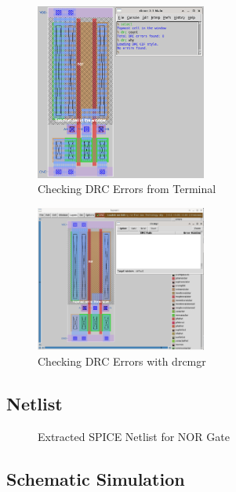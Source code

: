 \documentclass{article}
\begin{document}
	\begin{figure}[H]
		\centerline{\includegraphics[width=0.5\textwidth]{nor_drc_errors_terminal.png}}
		\caption{Checking DRC Errors from Terminal}
		\label{fig::nor_drc_errors_terminal}
	\end{figure}
	
	\begin{figure}[H]
		\centerline{\includegraphics[width=0.5\textwidth]{nor_drc_errors_drcmgr.png}}
		\caption{Checking DRC Errors with drcmgr}
		\label{fig::nor_drc_errors_drcmgr}
	\end{figure}
	
	\subsection{Netlist}
	
	\begin{figure}[H]
		
		\caption{Extracted SPICE Netlist for NOR Gate}
		\label{fig::nor_netlist}
	\end{figure}
	
	\subsection{Schematic Simulation}
	
\end{document}
